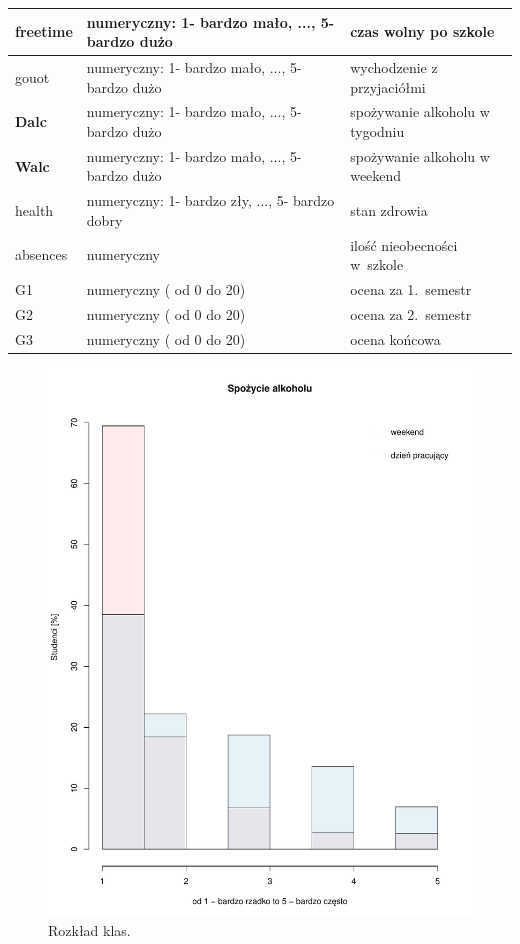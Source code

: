 \begin{table}[]
\begin{tabular}{|p{1.4cm}|p{3cm}|p{3cm}|}
freetime   &   numeryczny: 1- bardzo mało, ..., 5- bardzo dużo   & czas wolny po szkole   \\ \hline
gouot   &    numeryczny: 1- bardzo mało, ..., 5- bardzo dużo   &  wychodzenie z przyjaciółmi  \\ \hline
\textbf{Dalc}  &     numeryczny: 1- bardzo mało, ..., 5- bardzo dużo  & spożywanie alkoholu w tygodniu   \\ \hline
\textbf{Walc}   &    numeryczny: 1- bardzo mało, ..., 5- bardzo dużo   &  spożywanie alkoholu w weekend  \\ \hline
health   &  numeryczny: 1- bardzo zły, ..., 5- bardzo dobry    & stan zdrowia   \\ \hline
absences  &   numeryczny  &  ilość nieobecności w~szkole  \\ \hline
G1  &   numeryczny ( od 0 do 20)   &   ocena za 1.~semestr \\ \hline
G2  &   numeryczny ( od 0 do 20)     &  ocena za 2.~semestr  \\ \hline
G3   &    numeryczny ( od 0 do 20)     &  ocena końcowa  \\ \hline
\end{tabular}
\end{table}
\begin{figure}[h]
 \centering 
 \includegraphics[scale=0.40]{tex/alc.pdf}
\caption{Rozkład klas.}
 \label{fig:classes}
\end{figure}
